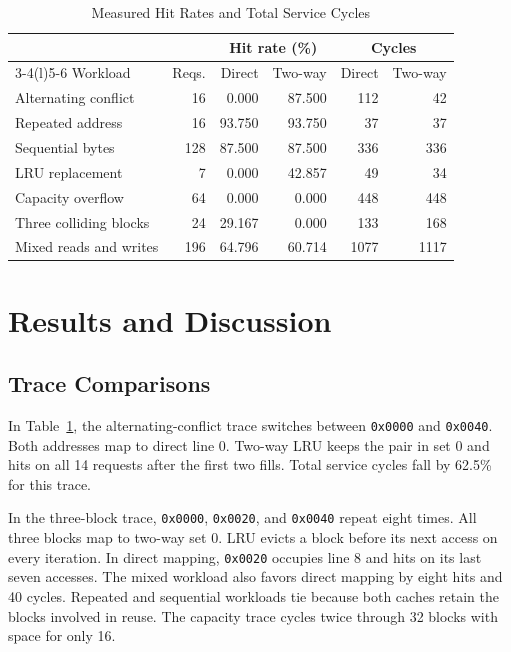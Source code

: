 \begin{table}[!t]
\caption{Measured Hit Rates and Total Service Cycles}
\label{tab:results}
\centering
\footnotesize
\setlength{\tabcolsep}{2.2pt}
\begin{tabular}{lrrrrr}
\toprule
& & \multicolumn{2}{c}{Hit rate (\%)} & \multicolumn{2}{c}{Cycles}\\
\cmidrule(lr){3-4}\cmidrule(l){5-6}
Workload & Reqs. & Direct & Two-way & Direct & Two-way\\
\midrule
Alternating conflict & 16 & 0.000 & 87.500 & 112 & 42\\
Repeated address & 16 & 93.750 & 93.750 & 37 & 37\\
Sequential bytes & 128 & 87.500 & 87.500 & 336 & 336\\
LRU replacement & 7 & 0.000 & 42.857 & 49 & 34\\
Capacity overflow & 64 & 0.000 & 0.000 & 448 & 448\\
Three colliding blocks & 24 & 29.167 & 0.000 & 133 & 168\\
Mixed reads and writes & 196 & 64.796 & 60.714 & 1077 & 1117\\
\bottomrule
\end{tabular}
\end{table}

\section{Results and Discussion}
\subsection{Trace Comparisons}
In Table~\ref{tab:results}, the alternating-conflict trace switches
between \texttt{0x0000} and \texttt{0x0040}. Both addresses map to direct
line 0. Two-way LRU keeps the pair in set 0 and hits on all 14 requests
after the first two fills. Total service cycles fall by 62.5\% for
this trace.

In the three-block trace, \texttt{0x0000}, \texttt{0x0020}, and
\texttt{0x0040} repeat eight times. All three blocks map to two-way
set 0. LRU evicts a block before its next access on every iteration.
In direct mapping, \texttt{0x0020} occupies line 8 and hits on its
last seven accesses. The mixed workload also favors direct mapping
by eight hits and 40 cycles. Repeated and sequential workloads tie
because both caches retain the blocks involved in reuse. The capacity
trace cycles twice through 32 blocks with space for only 16.

